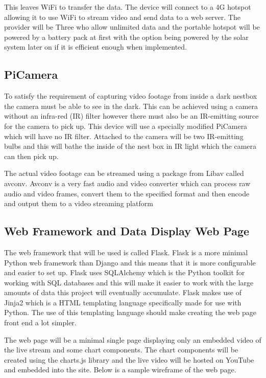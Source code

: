 \documentclass[10pt,a4paper]{article}
\begin{document}
This leaves WiFi to transfer the data. The device will connect to a 4G hotspot allowing it to use WiFi to stream video and send data to a web server. The provider will be Three who allow unlimited data and the portable hotspot will be powered by a battery pack at first with the option being powered by the solar system later on if it is efficient enough when implemented. 

\subsection{PiCamera}
To satisfy the requirement of capturing video footage from inside a dark nestbox the camera must be able to see in the dark. This can be achieved using a camera without an infra-red (IR) filter however there must also be an IR-emitting source for the camera to pick up. This device will use a specially modified PiCamera which will have no IR filter. Attached to the camera will be two IR-emitting bulbs and this will bathe the inside of the nest box in IR light which the camera can then pick up. 

The actual video footage can be streamed using a package from Libav called avconv. Avconv is a very fast audio and video converter which can process raw audio and video frames, convert them to the specified format and then encode and output them to a video streaming platform\cite{avconv}

\subsection{Web Framework and Data Display Web Page}
The web framework that will be used is called Flask. Flask is a more minimal Python web framework than Django and this means that it is more configurable and easier to set up. Flask uses SQLAlchemy which is the Python toolkit for working with SQL databases and this will make it easier to work with the large amounts of data this project will eventually accumulate. Flask makes use of Jinja2 which is a HTML templating language specifically made for use with Python. The use of this templating language should make creating the web page front end a lot simpler.

The web page will be a minimal single page displaying only an embedded video of the live stream and some chart components. The chart components will be created using the charts.js library and the live video will be hosted on YouTube and embedded into the site. Below is a sample wireframe of the web page. 
\end{document}
